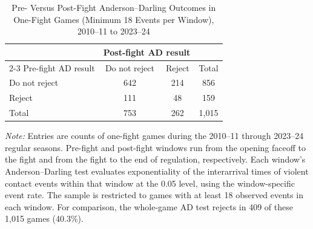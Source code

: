 \begin{table}[htbp]
\centering
\caption{Pre- Versus Post-Fight Anderson--Darling Outcomes in One-Fight Games (Minimum 18 Events per Window), 2010--11 to 2023--24}
\label{tab:one_fight_AD_rejection_min_18_20102011_20232024}
\small
\renewcommand{\arraystretch}{1.15}
\setlength{\tabcolsep}{6pt}

\begin{tabular*}{0.78\textwidth}{@{\extracolsep{\fill}}lccc}
\toprule
 & \multicolumn{2}{c}{Post-fight AD result} & \\
\cmidrule(lr){2-3}
Pre-fight AD result & Do not reject & Reject & Total \\
\midrule
Do not reject & 642 & 214 & 856 \\
Reject & 111 & 48 & 159 \\
\midrule
Total & 753 & 262 & 1,015 \\
\bottomrule
\end{tabular*}

\vspace{0.4em}
\parbox{0.78\textwidth}{
\footnotesize
\textit{Note:} Entries are counts of one-fight games during the 2010--11 through 2023--24 regular seasons. Pre-fight and post-fight windows run from the opening faceoff to the fight and from the fight to the end of regulation, respectively. Each window's Anderson--Darling test evaluates exponentiality of the interarrival times of violent contact events within that window at the 0.05 level, using the window-specific event rate. The sample is restricted to games with at least 18 observed events in each window. For comparison, the whole-game AD test rejects in 409 of these 1,015 games (40.3\%).
}
\end{table}
